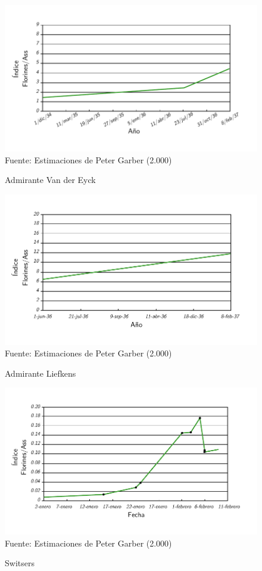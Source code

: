 \begin{figure}[!h] 
\caption{Admirante Van der Eyck} 
\centering \includegraphics[width=150mm]{capitulos/graficos/AdmiranteVanDerEyck} 
\label{fig:Admirante Van Der Eyck} 
	\footnotesize
	Fuente: Estimaciones de Peter Garber (2.000)
\end{figure}

\begin{figure}[!h] 
\caption{Admirante Liefkens} 
\centering \includegraphics[width=150mm]{capitulos/graficos/AdmiranteLiefkens} 
\label{fig:Admirante Liefkens} 
	\footnotesize
	Fuente: Estimaciones de Peter Garber (2.000)
\end{figure}

\begin{figure}[!h] 
\caption{Switsers} 
\centering \includegraphics[width=150mm]{capitulos/graficos/Switsers} 
\label{fig:Switsers} 
	\footnotesize
	Fuente: Estimaciones de Peter Garber (2.000)
\end{figure}


